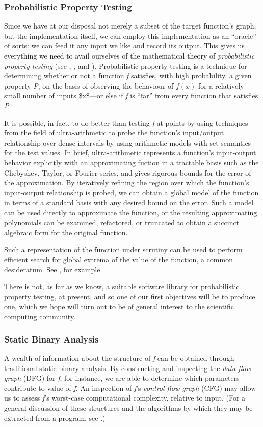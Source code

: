 \documentclass[11pt]{article}
\begin{document}
\subsubsection{Probabilistic Property Testing}
\label{sec:orga03c90d}
Since we have at our disposal not merely a subset of the target function's graph, but the implementation itself, we can employ this implementation as an ``oracle'' of sorts: we can feed it any input we like and record its output. This gives us everything we need to avail ourselves of the mathematical theory of \emph{probabilistic property testing} (see \cite{rubinfeld1996}, \cite{blais2012thesis}, and \cite{xie2018thesis}). Probabilistic property testing is a technique for determining whether or not a function \emph{f} satisfies, with high probability, a given property \emph{P}, on the basis of observing the behaviour of \(f(x)\) for a relatively small number of inputs \$x\$---or else if \emph{f} is ``far'' from every function that satisfies \emph{P}.

It is possible, in fact, to do better than testing \emph{f} at points by using techniques from the field of ultra-arithmetic to probe the function's input/output relationship over dense intervals by using arithmetic models with set semantics for the test values. In brief, ultra-arithmetic represents a function's input-output behavior explicitly with an approximating fuction in a tractable basis such as the Chebyshev, Taylor, or Fourier series, and gives rigorous bounds for the error of the approximation. By iteratively refining the region over which the function's input-output relationship is probed, we can obtain a global model of the function in terms of a standard basis with any desired bound on the error. Such a model can be used directly to approximate the function, or the resulting approximating polynomials can be examined, refactored, or truncated to obtain a succinct algebraic form for the original function.

Such a representation of the function under scrutiny can be used to perform efficient search for global extrema of the value of the function, a common desideratum. See \cite{makino2005verified_go}, for example. 

There is not, as far as we know, a suitable software library for probabilistic property testing, at present, and so one of our first objectives will be to produce one, which we hope will turn out to be of general interest to the scientific computing community.

\subsubsection{Static Binary Analysis}
\label{sec:orgbbcfddc}
A wealth of information about the structure of \emph{f} can be obtained through traditional static binary analysis. By constructing and inspecting the \emph{data-flow graph} (DFG) for \emph{f}, for instance, we are able to determine which parameters contribute to value of \emph{f}. An inspection of \emph{f}'s \emph{control-flow graph} (CFG) may allow us to assess \emph{f}'s worst-case computational complexity, relative to input. (For a general discussion of these structures and the algorithms by which they may be extracted from a program, see \cite{nielson2010ppa}.)
\end{document}
